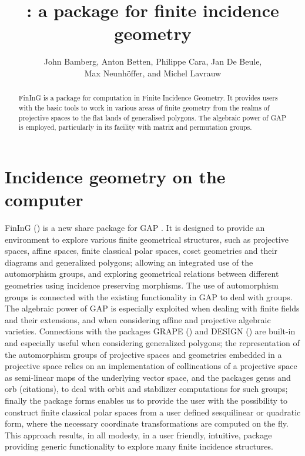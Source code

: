 \documentclass{article}
\author{John Bamberg, Anton Betten, Philippe Cara, Jan De Beule, \\Max Neunh\"offer, and Michel Lavrauw}
\title{\fining{}: a package for finite incidence geometry}
\def\fining{{\sf FinInG}}
\begin{document}
\maketitle
\begin{abstract}
\fining{} is a package for computation in Finite Incidence Geometry. It provides users with the basic tools to work 
in various areas of finite geometry from the realms of projective spaces to the flat lands of generalised polygons. 
The algebraic power of GAP is employed, particularly in its facility with matrix and permutation groups.
\end{abstract}

\section{Incidence geometry on the computer}	

\fining{} (\cite{fining}) is a new share package for GAP \cite{GAP4}. It is designed to provide an environment to explore various finite geometrical structures,
such as projective spaces, affine spaces, finite classical polar spaces, coset geometries and their diagrams and generalized polygons; 
allowing an integrated use of the automorphism groups, and exploring geometrical relations between different geometries using incidence 
preserving morphisms. The use of automorphism groups is connected with the existing functionality in GAP to deal with groups. The algebraic
power of GAP is especially exploited when dealing with finite fields and their extensions, and when considering affine and projective algebraic
varieties. Connections with the packages {\sf GRAPE} (\cite{grape}) and {\sf DESIGN} (\cite{design}) are built-in and especially useful when considering
generalized polygons; the representation of the automorphism groups of projective spaces and geometries embedded in a projective
space relies on an implementation of collineations of a projective space as semi-linear maps of the underlying vector space, and the 
packages {\sf genss} and {\sf orb} (citations), to deal with orbit and stabilizer computations for such groups; finally the package {\sf forms} \cite{forms}
enables us to provide the user with the possibility to construct finite classical polar spaces from a user defined sesquilinear or quadratic form,
where the necessary coordinate transformations are computed on the fly. This approach results, in all modesty, in a user friendly, intuitive, package
providing generic functionality to explore many finite incidence structures.
\end{document}
